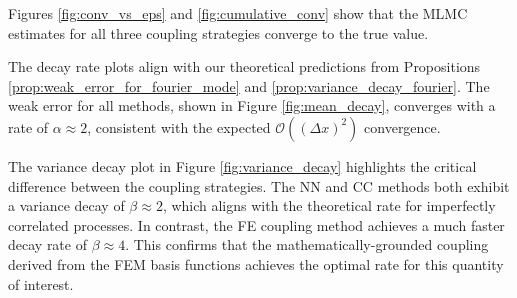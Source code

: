 Figures \ref{fig:conv_vs_eps} and \ref{fig:cumulative_conv} 
show that the MLMC estimates for all three coupling strategies converge to the true 
value. 


The decay rate plots align with our theoretical predictions from Propositions 
\ref{prop:weak_error_for_fourier_mode} and \ref{prop:variance_decay_fourier}. 
The weak error for all methods, shown in Figure \ref{fig:mean_decay},
converges with a rate of $\alpha \approx 2$, consistent with 
the expected $\mathcal{O}((\Delta x)^2)$ convergence.

The variance decay plot in Figure \ref{fig:variance_decay} highlights the critical 
difference between the coupling strategies. The NN and CC methods 
both exhibit a variance decay of $\beta \approx 2$, which aligns with the theoretical rate 
for imperfectly correlated processes. In contrast, the FE coupling 
method achieves a much faster decay rate of $\beta \approx 4$. This confirms that the 
mathematically-grounded coupling derived from the FEM basis functions achieves the optimal
rate for this quantity of interest.




